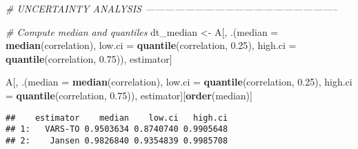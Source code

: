 \documentclass[11pt,]{article}
\newenvironment{Shaded}{\begin{snugshade}}{\end{snugshade}}
\newcommand{\CommentTok}[1]{\textcolor[rgb]{0.56,0.35,0.01}{\textit{#1}}}
\newcommand{\DataTypeTok}[1]{\textcolor[rgb]{0.13,0.29,0.53}{#1}}
\newcommand{\FloatTok}[1]{\textcolor[rgb]{0.00,0.00,0.81}{#1}}
\newcommand{\KeywordTok}[1]{\textcolor[rgb]{0.13,0.29,0.53}{\textbf{#1}}}
\newcommand{\NormalTok}[1]{#1}
\newcommand{\StringTok}[1]{\textcolor[rgb]{0.31,0.60,0.02}{#1}}
\begin{document}
\begin{Shaded}
\begin{Highlighting}[]
\CommentTok{# UNCERTAINTY ANALYSIS -----------------------------------------------------------}

\CommentTok{# Compute median and quantiles}
\NormalTok{dt_median <-}\StringTok{ }\NormalTok{A[, .(}\DataTypeTok{median =} \KeywordTok{median}\NormalTok{(correlation), }
                   \DataTypeTok{low.ci =} \KeywordTok{quantile}\NormalTok{(correlation, }\FloatTok{0.25}\NormalTok{), }
                   \DataTypeTok{high.ci =} \KeywordTok{quantile}\NormalTok{(correlation, }\FloatTok{0.75}\NormalTok{)), estimator]}

\NormalTok{A[, .(}\DataTypeTok{median =} \KeywordTok{median}\NormalTok{(correlation), }
      \DataTypeTok{low.ci =} \KeywordTok{quantile}\NormalTok{(correlation, }\FloatTok{0.25}\NormalTok{), }
      \DataTypeTok{high.ci =} \KeywordTok{quantile}\NormalTok{(correlation, }\FloatTok{0.75}\NormalTok{)), estimator][}\KeywordTok{order}\NormalTok{(median)]}
\end{Highlighting}
\end{Shaded}

\begin{verbatim}
##    estimator    median    low.ci   high.ci
## 1:   VARS-TO 0.9503634 0.8740740 0.9905648
## 2:    Jansen 0.9826840 0.9354839 0.9985708
\end{verbatim}
\end{document}

